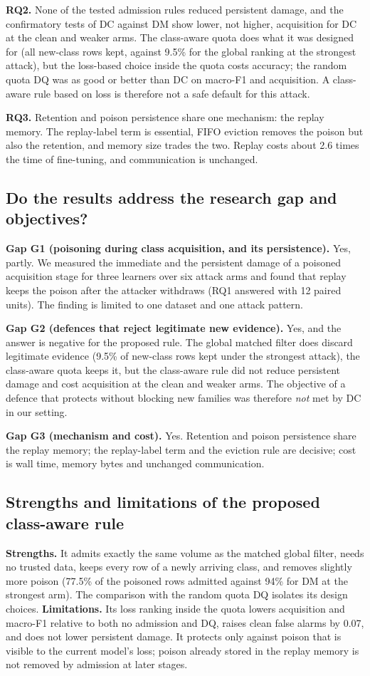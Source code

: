 \documentclass[10pt,a4paper]{article}
\begin{document}
\textbf{RQ2.} None of the tested admission rules reduced persistent damage, and the confirmatory tests of DC against DM show lower, not higher, acquisition for DC at the clean and weaker arms. The class-aware quota does what it was designed for (all new-class rows kept, against 9.5\% for the global ranking at the strongest attack), but the loss-based choice inside the quota costs accuracy; the random quota DQ was as good or better than DC on macro-F1 and acquisition. A class-aware rule based on loss is therefore not a safe default for this attack.

\textbf{RQ3.} Retention and poison persistence share one mechanism: the replay memory. The replay-label term is essential, FIFO eviction removes the poison but also the retention, and memory size trades the two. Replay costs about 2.6 times the time of fine-tuning, and communication is unchanged.


\subsection{Do the results address the research gap and objectives?}
\textbf{Gap G1 (poisoning during class acquisition, and its persistence).} Yes, partly. We measured the immediate and the persistent damage of a poisoned acquisition stage for three learners over six attack arms and found that replay keeps the poison after the attacker withdraws (RQ1 answered with 12 paired units). The finding is limited to one dataset and one attack pattern.

\textbf{Gap G2 (defences that reject legitimate new evidence).} Yes, and the answer is negative for the proposed rule. The global matched filter does discard legitimate evidence (9.5\% of new-class rows kept under the strongest attack), the class-aware quota keeps it, but the class-aware rule did not reduce persistent damage and cost acquisition at the clean and weaker arms. The objective of a defence that protects without blocking new families was therefore \emph{not} met by DC in our setting.

\textbf{Gap G3 (mechanism and cost).} Yes. Retention and poison persistence share the replay memory; the replay-label term and the eviction rule are decisive; cost is wall time, memory bytes and unchanged communication.

\subsection{Strengths and limitations of the proposed class-aware rule}
\textbf{Strengths.} It admits exactly the same volume as the matched global filter, needs no trusted data, keeps every row of a newly arriving class, and removes slightly more poison (77.5\% of the poisoned rows admitted against 94\% for DM at the strongest arm). The comparison with the random quota DQ isolates its design choices.
\textbf{Limitations.} Its loss ranking inside the quota lowers acquisition and macro-F1 relative to both no admission and DQ, raises clean false alarms by 0.07, and does not lower persistent damage. It protects only against poison that is visible to the current model's loss; poison already stored in the replay memory is not removed by admission at later stages.
\end{document}
